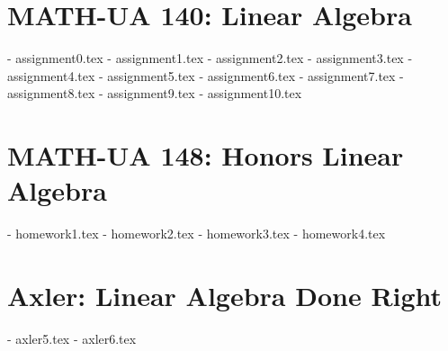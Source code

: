\section{MATH-UA 140: Linear Algebra}
- assignment0.tex
- assignment1.tex
- assignment2.tex
- assignment3.tex
- assignment4.tex
- assignment5.tex
- assignment6.tex
- assignment7.tex
- assignment8.tex
- assignment9.tex
- assignment10.tex

\section{MATH-UA 148: Honors Linear Algebra}
- homework1.tex
- homework2.tex
- homework3.tex
- homework4.tex

\section{Axler: Linear Algebra Done Right}
- axler5.tex
- axler6.tex
